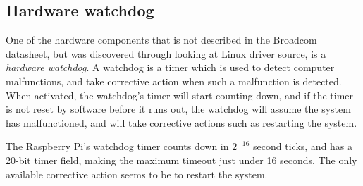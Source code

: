 \subsection{Hardware watchdog}
One of the hardware components that is not described in the Broadcom datasheet, but was discovered through looking at Linux driver source\cite{bcmwdt}, is a \emph{hardware watchdog}. A watchdog is a timer which is used to detect computer malfunctions, and take corrective action when such a malfunction is detected. When activated, the watchdog's timer will start counting down, and if the timer is not reset by software before it runs out, the watchdog will assume the system has malfunctioned, and will take corrective actions such as restarting the system.

The Raspberry Pi's watchdog timer counts down in $2^{-16}$ second ticks, and has a 20-bit timer field, making the maximum timeout just under 16 seconds. The only available corrective action seems to be to restart the system.
